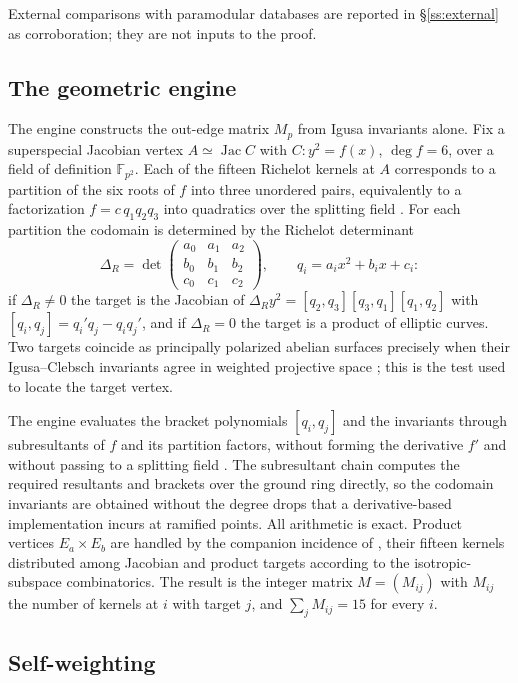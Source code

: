 \documentclass[10pt,a4paper]{amsart}
\newcommand{\F}{\mathbb{F}}
\DeclareMathOperator{\Jac}{Jac}
\begin{document}
	External comparisons with paramodular databases are reported in
	\S\ref{ss:external} as corroboration; they are not inputs to the proof.
	
	\subsection{The geometric engine}
	\label{ss:engine}
	
	The engine constructs the out-edge matrix $M_p$ from Igusa invariants
	alone. Fix a superspecial Jacobian vertex $A\simeq\Jac C$ with
	$C:y^2=f(x)$, $\deg f=6$, over a field of definition $\F_{p^2}$. Each of
	the fifteen Richelot kernels at $A$ corresponds to a partition of the six
	roots of $f$ into three unordered pairs, equivalently to a factorization
	$f=c\,q_1q_2q_3$ into quadratics over the splitting field
	\cite[\S8]{JordanZaytman}. For each partition the codomain is determined by
	the Richelot determinant
	\[
	\Delta_R=\det\begin{pmatrix}a_0&a_1&a_2\\ b_0&b_1&b_2\\ c_0&c_1&c_2
	\end{pmatrix},
	\qquad q_i=a_ix^2+b_ix+c_i:
	\]
	if $\Delta_R\ne0$ the target is the Jacobian of
	$\Delta_R y^2=[q_2,q_3][q_3,q_1][q_1,q_2]$ with
	$[q_i,q_j]=q_i'q_j-q_iq_j'$, and if $\Delta_R=0$ the target is a product
	of elliptic curves. Two targets coincide as principally polarized abelian
	surfaces precisely when their Igusa--Clebsch invariants agree in weighted
	projective space \cite{Igusa1960}; this is the test used to locate the
	target vertex.
	
	The engine evaluates the bracket polynomials $[q_i,q_j]$ and the
	invariants through subresultants of $f$ and its partition factors, without
	forming the derivative $f'$ and without passing to a splitting field \cite{Dang2025}. The
	subresultant chain computes the required resultants and brackets over the
	ground ring directly, so the codomain invariants are obtained without the
	degree drops that a derivative-based implementation incurs at ramified
	points. All arithmetic is exact. Product vertices $E_a\times E_b$ are
	handled by the companion incidence of \cite{KatsuraTakashima}, their
	fifteen kernels distributed among Jacobian and product targets according to
	the isotropic-subspace combinatorics. The result is the integer matrix
	$M=(M_{ij})$ with $M_{ij}$ the number of kernels at $i$ with target $j$,
	and $\sum_jM_{ij}=15$ for every $i$.
	
	\subsection{Self-weighting}
	\label{ss:selfweight}
	
\end{document}
